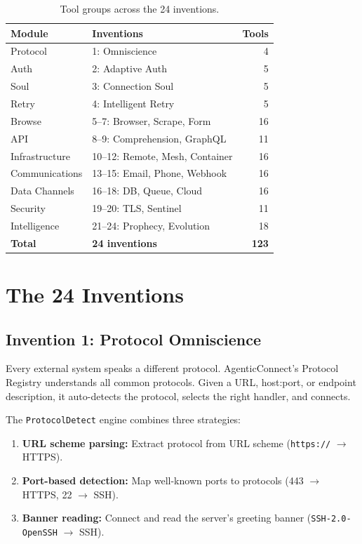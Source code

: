 \documentclass[10pt,twocolumn]{article}
\begin{document}
\begin{table}[h]
\centering
\caption{Tool groups across the 24 inventions.}
\label{tab:tools}
\begin{tabular}{@{}llr@{}}
\toprule
\textbf{Module} & \textbf{Inventions} & \textbf{Tools} \\
\midrule
Protocol & 1: Omniscience & 4 \\
Auth & 2: Adaptive Auth & 5 \\
Soul & 3: Connection Soul & 5 \\
Retry & 4: Intelligent Retry & 5 \\
Browse & 5--7: Browser, Scrape, Form & 16 \\
API & 8--9: Comprehension, GraphQL & 11 \\
Infrastructure & 10--12: Remote, Mesh, Container & 16 \\
Communications & 13--15: Email, Phone, Webhook & 16 \\
Data Channels & 16--18: DB, Queue, Cloud & 16 \\
Security & 19--20: TLS, Sentinel & 11 \\
Intelligence & 21--24: Prophecy, Evolution & 18 \\
\midrule
\textbf{Total} & \textbf{24 inventions} & \textbf{123} \\
\bottomrule
\end{tabular}
\end{table}

\section{The 24 Inventions}

\subsection{Invention 1: Protocol Omniscience}

Every external system speaks a different protocol. AgenticConnect's Protocol Registry understands all common protocols. Given a URL, host:port, or endpoint description, it auto-detects the protocol, selects the right handler, and connects.

The \texttt{ProtocolDetect} engine combines three strategies:
\begin{enumerate}
    \item \textbf{URL scheme parsing:} Extract protocol from URL scheme (\texttt{https://} $\rightarrow$ HTTPS).
    \item \textbf{Port-based detection:} Map well-known ports to protocols (443 $\rightarrow$ HTTPS, 22 $\rightarrow$ SSH).
    \item \textbf{Banner reading:} Connect and read the server's greeting banner (\texttt{SSH-2.0-OpenSSH} $\rightarrow$ SSH).
\end{enumerate}
\end{document}
